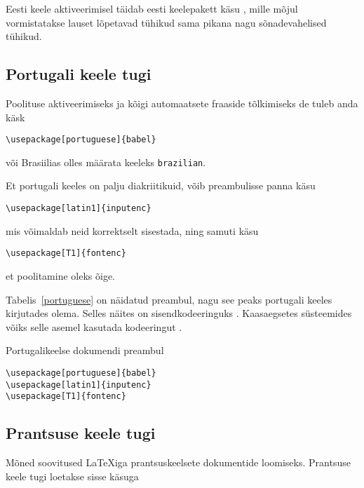 Eesti keele aktiveerimisel täidab eesti keelepakett käsu
, mille mõjul vormistatakse lauset lõpetavad tühikud
sama pikana nagu sõnadevahelised tühikud.

\subsection{Portugali keele tugi}

Poolituse aktiveerimiseks ja kõigi automaatsete fraaside tõlkimiseks
de tuleb anda käsk
\begin{lscommand}
\verb|\usepackage[portuguese]{babel}|
\end{lscommand}
\noindent või Brasiilias olles määrata keeleks \texttt{brazilian}.

Et portugali keeles on palju diakriitikuid, võib preambulisse panna
käsu
\begin{lscommand}
\verb|\usepackage[latin1]{inputenc}|
\end{lscommand}
\noindent mis võimaldab neid korrektselt sisestada, ning samuti käsu
\begin{lscommand}
\verb|\usepackage[T1]{fontenc}|
\end{lscommand}
\noindent et poolitamine oleks õige.

Tabelis~\ref{portuguese} on näidatud preambul, nagu see peaks portugali
keeles kirjutades olema. Selles näites on sisendkodeeringuks
. Kaasaegsetes süsteemides võiks selle asemel kasutada
kodeeringut .

\begin{table}[hbtp]
\caption{Portugalikeelse dokumendi preambul} \label{portuguese}
\begin{lined}{7cm}
\begin{verbatim}
\usepackage[portuguese]{babel}
\usepackage[latin1]{inputenc}
\usepackage[T1]{fontenc}
\end{verbatim}
\end{lined}
\end{table}

\subsection{Prantsuse keele tugi}

Mõned soovitused \LaTeX iga prantsuskeelsete
dokumentide loomiseks. Prantsuse keele tugi loetakse sisse käsuga

